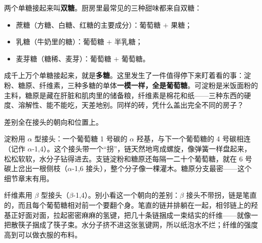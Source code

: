 两个单糖接起来叫\textbf{双糖}。厨房里最常见的三种甜味都来自双糖：

\begin{itemize}[itemsep=2pt]
\item 蔗糖（方糖、白糖、红糖的主要成分）：葡萄糖 $+$ 果糖；
\item 乳糖（牛奶里的糖）：葡萄糖 $+$ 半乳糖；
\item 麦芽糖（糖稀、麦芽）：葡萄糖 $+$ 葡萄糖。
\end{itemize}

成千上万个单糖接起来，就是\textbf{多糖}。这里发生了一件值得停下来盯着看的事：淀粉、糖原、纤维素，三种多糖的单体\textbf{一模一样，全是葡萄糖}。可淀粉是米饭面粉的主料，糖原是藏在肝脏和肌肉里的储备粮，纤维素是棉花和纸——三种东西的硬度、溶解性、能不能吃，天差地别。同样的砖，凭什么盖出完全不同的房子？

差别全在接头的朝向和位置上。

淀粉用 $\alpha$ 型接头：一个葡萄糖 1 号碳的 $\alpha$ 羟基，与下一个葡萄糖的 4 号碳相连（记作 $\alpha$-1,4）。这个接头带一个“拐”，链天然地弯成螺旋，像弹簧一样盘起来，松松软软，水分子钻得进去。支链淀粉和糖原还每隔一二十个葡萄糖，就在 6 号碳上岔出一根侧枝（$\alpha$-1,6 接头），整个分子像一棵灌木。糖原分支最密——这个细节章末有用。

纤维素用 $\beta$ 型接头（$\beta$-1,4）。别小看这一个朝向的差别：$\beta$ 接头不带拐，链是笔直的，而且每个葡萄糖相对前一个要翻个身。笔直的链并排躺在一起，相邻链上的羟基正好面对面，拉起密密麻麻的氢键，把几十条链捆成一束结实的纤维——就像一把散筷子捆成了筷子束。水分子挤不进这张氢键网，所以纸泡水不烂；纤维的强度高到可以做衣服的布料。

\begin{center}
\end{center}

